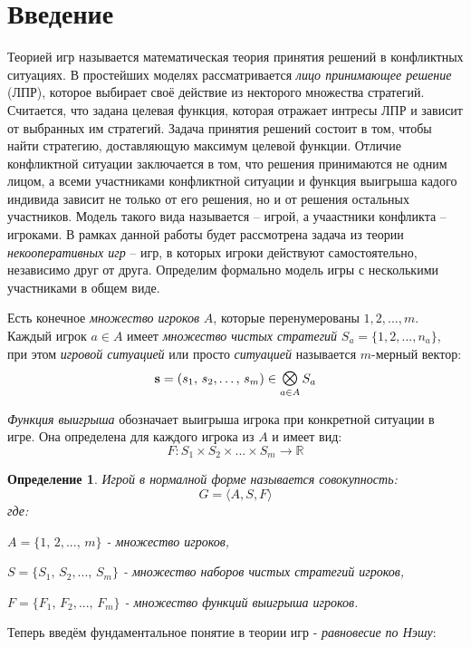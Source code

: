 \section{Введение}

Теорией игр называется математическая теория принятия решений
в конфликтных ситуациях. В простейших моделях рассматривается \textit{лицо
принимающее решение} (ЛПР), которое выбирает своё действие из некторого
множества стратегий. Считается, что задана целевая функция,
которая отражает интресы ЛПР и зависит от выбранных им стратегий.
Задача принятия решений состоит в том, чтобы найти стратегию, 
доставляющую максимум целевой функции. Отличие конфликтной ситуации
заключается в том, что решения принимаются не одним лицом, 
а всеми участниками конфликтной ситуации и функция выигрыша
кадого индивида зависит не только от его решения, но 
и от решения остальных участников.  Модель такого вида называется --
игрой, а учаастники конфликта -- игроками. В рамках данной работы
будет рассмотрена задача из теории \textit{некооперативных игр} -- 
игр, в которых игроки действуют самостоятельно, независимо друг 
от друга. Определим формально модель игры с несколькими участниками в общем виде.

Есть конечное \textit{множество игроков} $A$, которые перенумерованы
$1, 2, ..., m$. Каждый игрок $a \in A$ имеет 
\textit{множество чистых стратегий} $S_a=\{1,2,...,n_a\}$, при этом 
\textit{игровой ситуацией} или просто \textit{ситуацией}
называется $m$-мерный вектор:
\begin{equation}
	\textbf{s} = (s_1, \, s_2, \ldots , \, s_m) \in
	\Motimes_{a \in A} S_a
	\label{eq:game_situation}
\end{equation}

\textit{Функция выигрыша} обозначает выигрыша игрока при конкретной ситуации в игре. Она определена для каждого игрока из $A$ и имеет вид:
\begin{equation}
	F: S_1 \times S_2 \times ... \times S_m \rightarrow \mathbb R
	\label{eq:single_dim_payoff_function}
\end{equation}

\newtheorem{Def}{Определение}
\begin{Def}
	Игрой в нормалной форме называется совокупность:
	\begin{equation}
		G = \big \langle A, S, F \big \rangle
		\label{eq:normal_form_game}
	\end{equation}
	где: 
 
	$ A = \{1, \, 2, ..., \, m\}$ - множество игроков,

	$ S = \{S_1, \, S_2, ..., \, S_m\}$ - множество наборов чистых
	стратегий игроков,

	$ F = \{F_1, \, F_2, ..., \, F_m\}$ - множество функций выигрыша
	игроков.
\end{Def}
Теперь введём фундаментальное понятие в теории игр - 
\textit{равновесие по Нэшу}:

